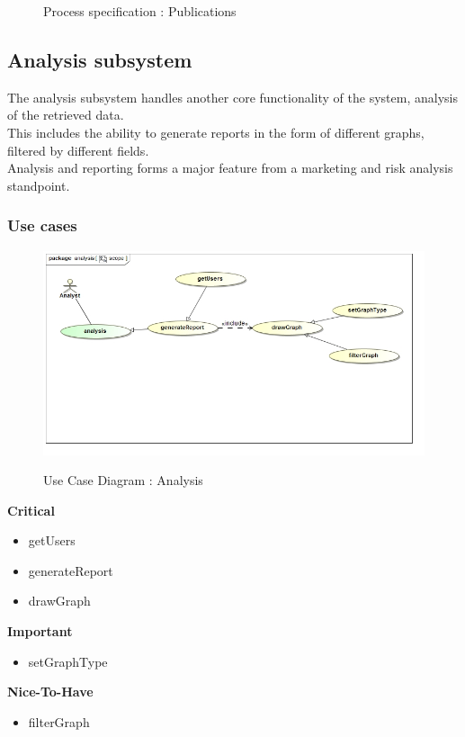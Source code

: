 \documentclass{article}
\begin{document}
		\begin{figure}[H]
		\caption{Process specification : Publications}
		\end{figure}
		
	\pagebreak
	\subsection{Analysis subsystem}\label{subsec:Analysis}
	The analysis subsystem handles another core functionality of the system, analysis of the retrieved data.\\ This includes the ability to generate reports in the form of different graphs, filtered by different fields.\\ Analysis and reporting forms a major feature from a marketing and risk analysis standpoint.
		\subsubsection{Use cases}

		\begin{figure}[H]
		\includegraphics[width=\textwidth]{images/uc__analysis__scope.jpg}  \\
		\caption{Use Case Diagram : Analysis}
		\end{figure}

		\begin{flushleft}
			\textbf{Critical}
				\begin{itemize}
					\item getUsers
					\item generateReport
					\item drawGraph
				\end{itemize}
			\textbf{Important}
				\begin{itemize}
				\item setGraphType
				\end{itemize}

			\textbf{Nice-To-Have}
				\begin{itemize}
					\item filterGraph
				\end{itemize}
		\end{flushleft}
\end{document}
